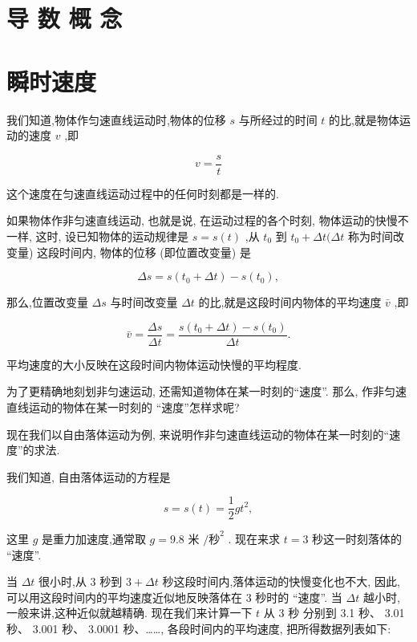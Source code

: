 \documentclass[lang=cn,newtx,10pt,scheme=chinese]{elegantbook}
\begin{document}
\section*{导 数 概 念}

\section{瞬时速度}

我们知道,物体作匀速直线运动时,物体的位移 \(s\) 与所经过的时间 \(t\) 的比,就是物体运动的速度 \(v\) ,即

\[
v = \frac{s}{t}
\]

这个速度在匀速直线运动过程中的任何时刻都是一样的.

如果物体作非匀速直线运动, 也就是说, 在运动过程的各个时刻, 物体运动的快慢不一样, 这时, 设已知物体的运动规律是 \(s = s\left( t\right)\) ,从 \({t}_{0}\) 到 \({t}_{0} + {\Delta t}({\Delta t}\) 称为时间改变量) 这段时间内, 物体的位移 (即位置改变量) 是

\[
{\Delta s} = s\left( {{t}_{0} + {\Delta t}}\right) - s\left( {t}_{0}\right) ,
\]

那么,位置改变量 \({\Delta s}\) 与时间改变量 \({\Delta t}\) 的比,就是这段时间内物体的平均速度 \(\bar{v}\) ,即

\[
\bar{v} = \frac{\Delta s}{\Delta t} = \frac{s\left( {{t}_{0} + {\Delta t}}\right) - s\left( {t}_{0}\right) }{\Delta t}.
\]

平均速度的大小反映在这段时间内物体运动快慢的平均程度.

为了更精确地刻划非匀速运动, 还需知道物体在某一时刻的“速度”. 那么, 作非匀速直线运动的物体在某一时刻的 “速度”怎样求呢?

现在我们以自由落体运动为例, 来说明作非匀速直线运动的物体在某一时刻的“速度”的求法.

我们知道, 自由落体运动的方程是

\[
s = s\left( t\right) = \frac{1}{2}g{t}^{2},
\]

这里 \(g\) 是重力加速度,通常取 \(g = {9.8}\) 米 \(/{\text{秒}}^{2}\) . 现在来求 \(t = 3\) 秒这一时刻落体的 “速度”.

当 \({\Delta t}\) 很小时,从 3 秒到 \(3 + {\Delta t}\) 秒这段时间内,落体运动的快慢变化也不大, 因此, 可以用这段时间内的平均速度近似地反映落体在 3 秒时的 “速度”. 当 \({\Delta t}\) 越小时,一般来讲,这种近似就越精确. 现在我们来计算一下 \(t\) 从 3 秒 分别到 3.1 秒、 3.01 秒、 3.001 秒、 3.0001 秒、……, 各段时间内的平均速度, 把所得数据列表如下:
\end{document}
